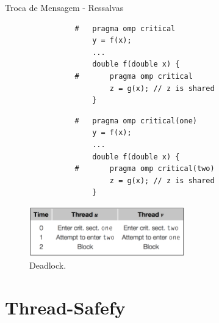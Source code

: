 	\begin{frame}[fragile]{Troca de Mensagem - Ressalvas}
		\begin{multicols}{2}
			\begin{verbatim}
				#	pragma omp critical
					y = f(x);
					...
					double f(double x) {
				#		pragma omp critical
						z = g(x); // z is shared
					}
			\end{verbatim}
		\columnbreak
			\begin{verbatim}
				#	pragma omp critical(one)
					y = f(x);
					...
					double f(double x) {
				#		pragma omp critical(two)
						z = g(x); // z is shared
					}
			\end{verbatim}
		\end{multicols}

		\begin{figure}[p]
			\centering
			\includegraphics[width=0.6\textwidth]{img/pacheco/deadlock.png}
			\caption{Deadlock.}
		\end{figure}
\end{frame}











\section{Thread-Safefy}
